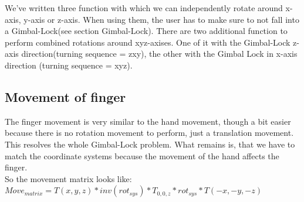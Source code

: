 We've written three function with which we can independently rotate around x-axis, y-axis or z-axis. When using them, the user has to make sure to not fall into a Gimbal-Lock(see section Gimbal-Lock).
There are two additional function to perform combined rotations around xyz-axises. One of it with the Gimbal-Lock z-axis direction(turning sequence = zxy), the other with the Gimbal Lock in x-axis direction (turning sequence = xyz).
\subsection{Movement of finger}
The finger movement is very similar to the hand movement, though a bit easier because there is no rotation movement to perform, just a translation movement. This resolves the whole Gimbal-Lock problem. What remains is, that we have to match the coordinate systems because the movement of the hand affects the finger.\\
So the movement matrix looks like:\\
$Move_{matrix}=T(x,y,z)*inv(rot_{sys})*T_{0,0,z}*rot_{sys}*T(-x,-y,-z)$
\pagebreak

